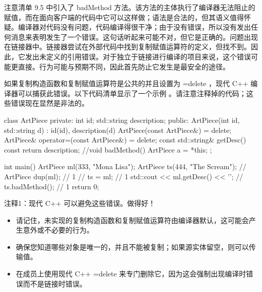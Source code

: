 注意清单 9.5 中引入了 badMethod 方法。该方法的主体执行了编译器无法阻止的赋值，而在面向客户端的代码中它可以这样做；语法是合法的，但其语义值得怀疑。编译器对代码没有问题，代码编译得很干净；由于没有错误，所以没有发出任何消息来表明发生了一个错误。这句话听起来可能不对，但它是正确的。问题出现在链接器中。链接器尝试在外部代码中找到复制赋值运算符的定义，但找不到。因此，它发出未定义的引用错误。对于独立于链接进行编译的项目来说，这个错误可能更直接。行为可能与预期不同，因此首先防止它发生是最安全的途径。

如果复制构造函数和复制赋值运算符是公共的并且设置为 =delete ，现代 C++ 编译器可以捕获此错误。以下代码清单显示了一个示例 。请注意注释掉的代码；这些错误现在显然是非法的。


\begin{cpp}
class ArtPiece {
private:
  int id;
  std::string description;
public:
  ArtPiece(int id, std::string d) : id(id), description(d) {}
  ArtPiece(const ArtPiece&) = delete;
  ArtPiece& operator=(const ArtPiece&) = delete;
  const std::string& getDesc() const { return description; }
  //void badMethod() { ArtPiece a = *this; }
};

int main() {
  ArtPiece ml(333, "Mona Lisa");
  ArtPiece ts(444, "The Scream");
  // ArtPiece dup(ml); // 1
  // ts = ml; // 1
  std::cout << ml.getDesc() << '\n';
  // ts.badMethod(); // 1
  return 0;
}
\end{cpp}

{\footnotesize
注释1：现代 C++ 可以避免这些错误。做得好！
}


\begin{itemize}
\item
请记住，未实现的复制构造函数和复制赋值运算符由编译器默认，这可能会产生意外或不必要的行为。

\item
确保您知道哪些对象是唯一的，并且不能被复制；如果源实体留空，则可以传输值。

\item
在成员上使用现代 C++ =delete 来专门删除它，因为这会强制出现编译时错误而不是链接时错误。
\end{itemize}
